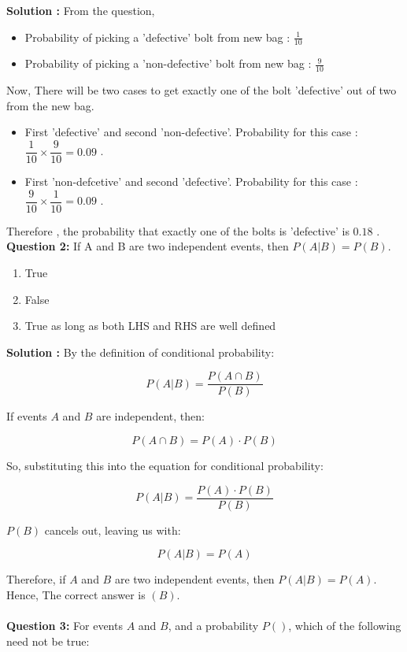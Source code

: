 \documentclass[10pt]{article}
\begin{document}
\textbf{Solution :} From the question,
\begin{itemize}
    \item Probability of picking a 'defective' bolt from new bag : \( \frac{1}{10} \)
    \item Probability of picking a 'non-defective' bolt from new bag : \( \frac{9}{10} \)
\end{itemize}
Now, There will be two cases to get exactly one of the bolt 'defective' out of two from the new bag. 
\begin{itemize}
    \item First 'defective' and second 'non-defective'. Probability for this case : $\dfrac{1}{10} \times \dfrac{9}{10} =0.09 $ .
    \item First 'non-defcetive' and second 'defective'. Probability for this case : $\dfrac{9}{10} \times \dfrac{1}{10} =0.09 $ .
\end{itemize}
Therefore , the probability that exactly one of the bolts is 'defective' is $0.18$ . 
\\

\textbf{Question 2:}
If A and B are two independent events, then $P(A|B) = P(B)$.
\begin{enumerate}[label = (\Alph*)]
  \item True
  \item False
  \item True as long as both LHS and RHS are well defined   
\end{enumerate}

\textbf{Solution :}
By the definition of conditional probability:

\[
P(A|B) = \frac{P(A \cap B)}{P(B)}
\]

If events $A$ and $B$ are independent, then:

\[
P(A \cap B) = P(A) \cdot P(B)
\]

So, substituting this into the equation for conditional probability:

\[
P(A|B) = \frac{P(A) \cdot P(B)}{P(B)}
\]

$P(B)$ cancels out, leaving us with:

\[
P(A|B) = P(A)
\]

Therefore, if $A$ and $B$ are two independent events, then $P(A|B) = P(A)$. \\
Hence, The correct answer is $(B)$.\\
\\

\textbf{Question 3:} For events \(A\) and \(B\), and a probability \(P()\), which of the following need not be true:
\end{document}
